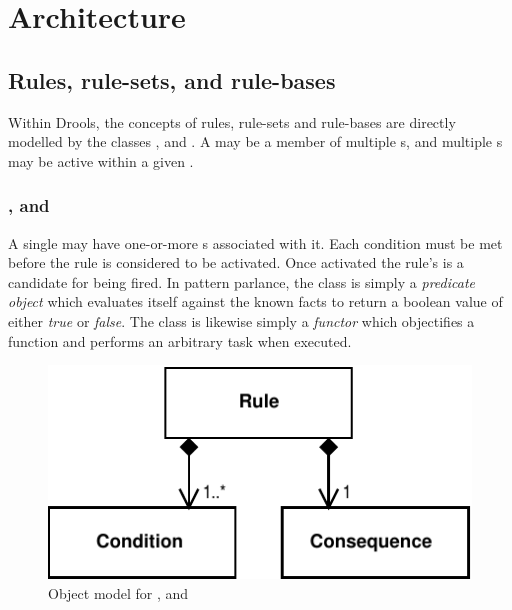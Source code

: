 \chapter{Architecture}

\section{Rules, rule-sets, and rule-bases}

Within Drools, the concepts of rules, rule-sets and rule-bases
are directly modelled by the classes ,
 and .  A 
may be a member of multiple s, and multiple
s may be active within a given
.

\subsection{,  and }

A single  may have one-or-more
s associated with it.  Each condition 
must be met before the rule is considered to be activated.
Once activated the rule's  is a
candidate for being fired.  In pattern parlance, the
 class is simply a \emph{predicate
object} which evaluates itself against
the known facts to return a boolean value of either \emph{true}
or \emph{false}.  The  class is likewise
simply a \emph{functor} which objectifies a function and performs
an arbitrary task when executed.

\begin{figure}[h]
  \begin{center}
  \includegraphics{rule}
  \end{center}
  \caption{Object model for ,  and }
\end{figure}

